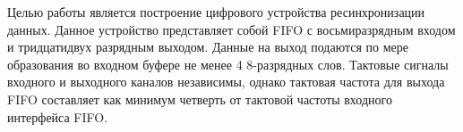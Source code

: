 \Introduction

Целью работы является построение цифрового устройства ресинхронизации данных. Данное устройство представляет собой FIFO с восьмиразрядным входом и тридцатидвух разрядным выходом. Данные на выход подаются по мере образования во входном буфере не менее 4 8-разрядных слов. Тактовые сигналы входного и выходного каналов независимы, однако тактовая частота для выхода FIFO составляет как минимум  четверть от тактовой частоты входного интерфейса FIFO.


%

